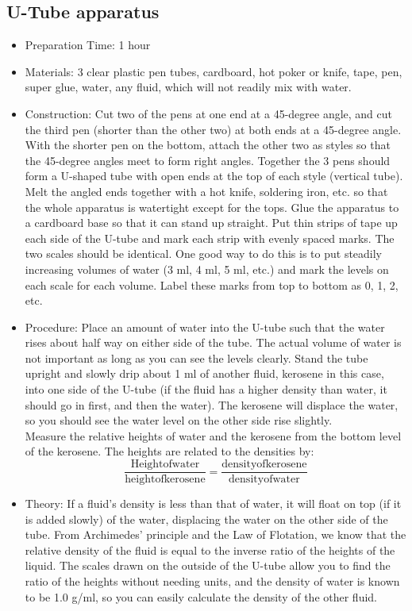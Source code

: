 \subsection{U-Tube apparatus}
\begin{itemize}
\item{Preparation Time: 1 hour}
\item{Materials: 3 clear plastic pen tubes, cardboard, hot poker or knife, tape, pen, super glue, water, any fluid, which will not readily mix with water.}
\item{Construction: Cut two of the pens at one end at a 45-degree angle, and cut the third pen (shorter than the other two) at both ends at a 45-degree angle. With the shorter pen on the bottom, attach the other two as styles so that the 45-degree angles meet to form right angles. Together the 3 pens should form a U-shaped tube with open ends at the top of each style (vertical tube). Melt the angled ends together with a hot knife, soldering iron, etc. so that the whole apparatus is watertight except for the tops. Glue the apparatus to a cardboard base so that it can stand up straight. Put thin strips of tape up each side of the U-tube and mark each strip with evenly spaced marks. The two scales should be identical. One good way to do this is to put steadily increasing volumes of water (3 ml, 4 ml, 5 ml, etc.) and mark the levels on each scale for each volume. Label these marks from top to bottom as 0, 1, 2, etc.}
\item{Procedure: Place an amount of water into the U-tube such that the water rises about half way on either side of the tube. The actual volume of water is not important as long as you can see the levels clearly. Stand the tube upright and slowly drip about 1 ml of another fluid, kerosene in this case, into one side of the U-tube (if the fluid has a higher density than water, it should go in first, and then the water). The kerosene will displace the water, so you should see the water level on the other side rise slightly.\\
Measure the relative heights of water and the kerosene from the bottom level of the kerosene. The heights are related to the densities by:
\[ \frac{\mathrm{Height of water}}{\mathrm{height of kerosene}} = \frac{\mathrm{density of kerosene}}{\mathrm{density of water}} \]
} %
\item{Theory: If a fluid’s density is less than that of water, it will float on top (if it is added slowly) of the water, displacing the water on the other side of the tube. From Archimedes’ principle and the Law of Flotation, we know that the relative density of the fluid is equal to the inverse ratio of the heights of the liquid. The scales drawn on the outside of the U-tube allow you to find the ratio of the heights without needing units, and the density of water is known to be 1.0 g/ml, so you can easily calculate the density of the other fluid.\\
}
\end{itemize}
